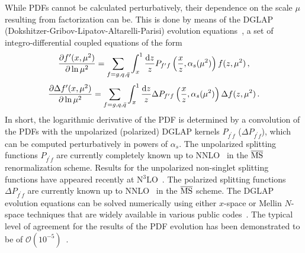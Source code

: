 While PDFs cannot be calculated perturbatively, their dependence on the scale 
$\mu$ resulting from factorization can be.
%
This is done by means of the
DGLAP (Dokshitzer-Gribov-Lipatov-Altarelli-Parisi) 
evolution equations~\cite{Dokshitzer:1977sg,Gribov:1972ri,Altarelli:1977zs},
a set of integro-differential coupled equations of the form
\begin{equation}
  \label{eq:dglapunp}
\frac{\partial f^\prime(x,\mu^2)}{\partial \ln \mu^2}
=
\sum_{f=g,q,\bar{q}}\int_x^1 
\frac{{\rm d}z}{z}P_{f^\prime f}\left(\frac{x}{z},\alpha_s(\mu^2)\right)f(z,\mu^2)\, ,
\end{equation}
%
\begin{equation}
  \label{eq:dglappol}
\frac{\partial \Delta f^\prime(x,\mu^2)}{\partial \ln \mu^2}
=
\sum_{f=g,q,\bar{q}}\int_x^1 
\frac{{\rm d}z}{z}\Delta P_{f^\prime f}\left(\frac{x}{z},\alpha_s(\mu^2)\right)\Delta f(z,\mu^2)\, .
\end{equation}
%
In short, the logarithmic derivative of the PDF is determined by a convolution
of the PDFs with the unpolarized (polarized) DGLAP kernels $P_{f^\prime f}$
($\Delta P_{f^\prime f}$), which can be 
computed perturbatively in powers of $\alpha_{s}$.
%
The unpolarized splitting functions $P_{f^\prime f}$ are currently completely 
known up to NNLO~\cite{Moch:2004pa,Vogt:2004mw} in the $\overline{\rm MS}$ 
renormalization scheme.
%
Results for the unpolarized non-singlet splitting functions have appeared 
recently at N$^3$LO~\cite{Davies:2016jie,Moch:2017uml}.
%
The polarized splitting functions $\Delta P_{f^\prime f}$ are currently known 
up to  NNLO~\cite{Moch:2014sna} in the $\overline{\rm MS}$ scheme.
%
The DGLAP evolution equations can be solved numerically using
either $x$-space or Mellin $N$-space techniques that are widely available 
in various public codes~\cite{Vogt:2004ns,Salam:2008qg,Botje:2010ay,
Bertone:2013vaa,Bertone:2015cwa}.
%
The typical level of agreement for the results of the PDF evolution 
has been demonstrated to be of 
$\mathcal{O}(10^{-5})$~\cite{Giele:2002hx,Dittmar:2005ed}.

%
%
%
%

